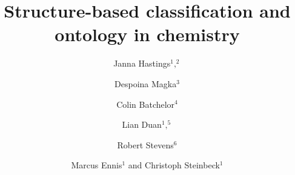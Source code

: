 \documentclass[10pt]{bmc_article}
\newenvironment{bmcformat}{\baselineskip20pt\sloppy\setboolean{publ}{false}}{\baselineskip20pt\sloppy}
\begin{document}
\begin{bmcformat}
 
 


\title{Structure-based classification and ontology in chemistry}
 


\author{Janna Hastings\correspondingauthor$^1,^2$%
       \and 
         Despoina Magka$^3$%
       \and
	     	 Colin Batchelor$^4$  %
       \and 
         Lian Duan$^1,^5$%
       \and 
         Robert Stevens$^6$  %
       \and 
         Marcus Ennis$^1$ %
       and 
       	 Christoph Steinbeck$^1$%
      }
      


\address{%
    \iid(1)Chemoinformatics and Metabolism, European Bioinformatics Institute, Hinxton, UK\\
    \iid(2)Swiss Center for Affective Sciences, University of Geneva, Switzerland\\
    \iid(3)Department of Computer Science, University of Oxford, UK\\
    \iid(4)Royal Society of Chemistry, Cambridge, UK\\
    \iid(5)ETH, Z\"{u}rich, Switzerland\\
    \iid(5)Manchester University, UK%
}%


\end{bmcformat}
\end{document}
